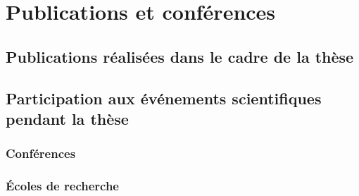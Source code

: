 \chapter*{Publications et conférences}

\section*{Publications réalisées dans le cadre de la thèse}



\section*{Participation aux événements scientifiques pendant la thèse}

\subsection*{Conférences}

\subsection*{Écoles de recherche}
